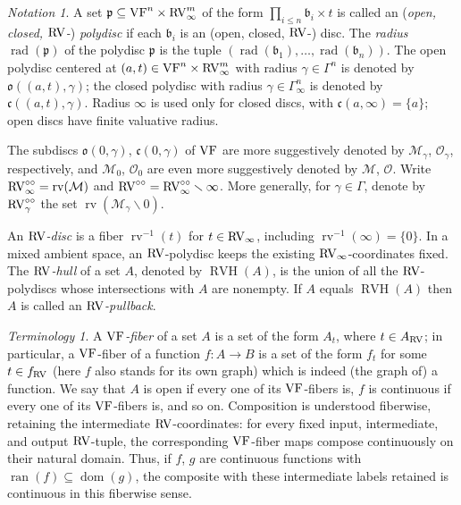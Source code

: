 \documentclass[12pt]{amsart}
\newcommand{\memph}[1]{{\color{magenta}\emph{#1}}}
\theoremstyle{plain}
\theoremstyle{definition}
\theoremstyle{remark}
\newtheorem{ter}[thm]{Terminology}
\newtheorem{nota}[thm]{Notation}
\numberwithin{equation}{section}
\theoremstyle{plain}
\newcommand{\VF}{\textup{VF}}
\newcommand{\RV}{\textup{RV}}
\newcommand{\MM}{\mdl M}
\newcommand{\OO}{\mdl O}
\DeclareMathOperator{\ran}{ran}
\DeclareMathOperator{\dom}{dom}
\newcommand{\gb}{\mathfrak{b}}
\newcommand{\gc}{\mathfrak{c}}
\newcommand{\go}{\mathfrak{o}}
\newcommand{\gp}{\mathfrak{p}}
\newcommand{\0}{\emptyset}
\newcommand{\mdl}[1]{\mathcal{#1}}  %
\newcommand{\fun}{\longrightarrow}
\newcommand{\sub}{\subseteq}
\newcommand{\mi}{\smallsetminus}
\DeclareMathOperator{\rv}{rv}
\DeclareMathOperator{\rad}{rad}
\DeclareMathOperator{\RVH}{RVH}
\newcommand{\ccirc}{\circ \circ}
\begin{document}
\begin{nota}\label{defn:disc}
A set $\gp \sub \VF^n \times \RV_\infty^m$ of the form $\prod_{i \leq n} \gb_i \times t$ is called an (\memph{open, closed, $\RV$-}) \memph{polydisc} if each $\gb_i$ is an (open, closed, $\RV$-) disc. The \memph{radius} $\rad(\gp)$ of the polydisc $\gp$ is the tuple $(\rad(\gb_1), \ldots, \rad(\gb_n))$. The open polydisc centered at $(a,t) \in \VF^n \times \RV_\infty^m$ with radius $\gamma \in \Gamma^n$ is denoted by $\go((a,t), \gamma)$; the closed polydisc with radius $\gamma \in \Gamma_\infty^n$ is denoted by $\gc((a,t), \gamma)$. Radius $\infty$ is used only for closed discs, with $\gc(a,\infty)=\{a\}$; open discs have finite valuative radius.

The subdiscs $\go(0, \gamma)$, $\gc(0, \gamma)$ of $\VF$ are more suggestively denoted by $\MM_\gamma$, $\OO_\gamma$, respectively, and $\MM_0$, $\OO_0$ are even more suggestively denoted by $\MM$, $\OO$. Write $\RV^{\ccirc}_\infty = \rv(\MM)$ and $\RV^{\ccirc} = \RV^{\ccirc}_\infty \mi \infty$. More generally, for $\gamma \in \Gamma$, denote by $\RV^{\ccirc}_\gamma$ the set $\rv(\MM_{\gamma} \mi 0)$.

An \memph{$\RV$-disc} is a fiber $\rv^{-1}(t)$ for $t\in\RV_\infty$, including $\rv^{-1}(\infty)=\{0\}$. In a mixed ambient space, an $\RV$-polydisc keeps the existing $\RV_\infty$-coordinates fixed. The \memph{$\RV$-hull} of a set $A$, denoted by $\RVH(A)$, is the union of all the $\RV$-polydiscs whose intersections with $A$ are nonempty. If $A$ equals $\RVH(A)$ then $A$ is called an \memph{$\RV$-pullback}.
\end{nota}


\begin{ter}\label{rvfiber}
A \memph{$\VF$-fiber} of a set $A$ is a set of the form $A_t$, where $t \in A_{\RV}$; in particular,  a $\VF$-fiber of a function $f : A \fun B$ is a set of the form $f_t$ for some  $t \in f_{\RV}$ (here $f$ also stands for its own graph) which is indeed (the graph of) a function.  We say that $A$ is open if every one of its $\VF$-fibers is, $f$ is continuous if every one of its $\VF$-fibers is, and so on. Composition is understood fiberwise, retaining the intermediate $\RV$-coordinates: for every fixed input, intermediate, and output $\RV$-tuple, the corresponding $\VF$-fiber maps compose continuously on their natural domain. Thus, if $f$, $g$ are continuous functions with $\ran(f)\sub\dom(g)$, the composite with these intermediate labels retained is continuous in this fiberwise sense.
\end{ter}
\end{document}
